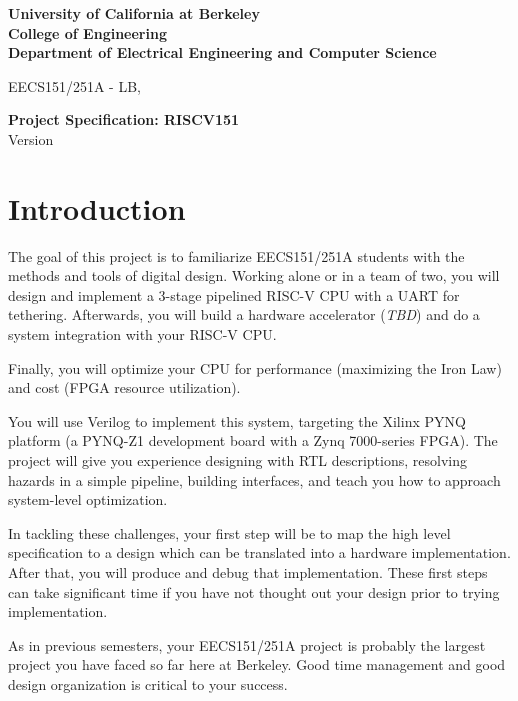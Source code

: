 \documentclass[11pt]{article}
\begin{document}
\begin{center}
{\bf
University of California at Berkeley \\
College of Engineering \\
Department of Electrical Engineering and Computer Science \\
}
\end{center}

\begin{center}
EECS151/251A - LB, \currentSemester
\end{center}

\begin{center}
\LARGE
{\bf Project Specification: RISCV151 }  \\
Version \projectSpecVersion
\end{center}

\tableofcontents

\newpage

\section{Introduction}
The goal of this project is to familiarize EECS151/251A students with the methods and tools of digital design.
Working alone or in a team of two, you will design and implement a 3-stage pipelined RISC-V CPU with a UART for tethering.
Afterwards, you will build a hardware accelerator (\textit{TBD}) and do a system integration with your RISC-V CPU.

Finally, you will optimize your CPU for performance (maximizing the Iron Law) and cost (FPGA resource utilization).

You will use Verilog to implement this system, targeting the Xilinx PYNQ platform (a PYNQ-Z1 development board with a Zynq 7000-series FPGA).
The project will give you experience designing with RTL descriptions, resolving hazards in a simple pipeline, building interfaces, and teach you how to approach system-level optimization.

In tackling these challenges, your first step will be to map the high level specification to a design which can be translated into a hardware implementation.
After that, you will produce and debug that implementation.
These first steps can take significant time if you have not thought out your design prior to trying implementation.

As in previous semesters, your EECS151/251A project is probably the largest project you have faced so far here at Berkeley.
Good time management and good design organization is critical to your success.
\end{document}
